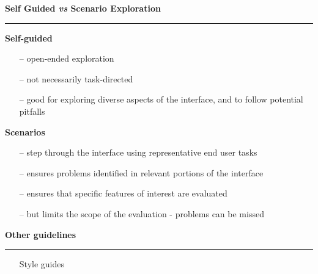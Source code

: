 \documentclass[pdf]{beamer}
\begin{document}
\begin{frame}
{\textbf{Self Guided \textit{vs} Scenario Exploration}}{\textcolor{red}{\rule{12cm}{1.2pt}}}

    \textbf{Self-guided}
    \begin{itemize}
    	\item [--] open-ended exploration
        \item [--] not necessarily task-directed
        \item [--] good for exploring diverse aspects of the interface, and to follow potential pitfalls
    \end{itemize}
    \bigskip
    \textbf{Scenarios}
    \begin{itemize}
    	\item [--] step through the interface using representative end user tasks
        \item [--] ensures problems identified in relevant portions of the interface
        \item [--] ensures that specific features of interest are evaluated
        \item [--] but limits the scope of the evaluation - problems can be missed
    \end{itemize}
    
    \vspace{30px}
\end{frame}



\begin{frame}
{\textbf{Other guidelines}}{\textcolor{red}{\rule{12cm}{1.2pt}}}
   
	\begin{itemize}
		\item[] {Style guides}
    \end{itemize}
\end{frame}
\end{document}
